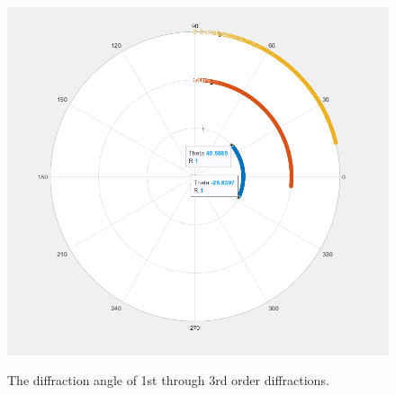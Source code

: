 \documentclass[journal]{IEEEtran}
\begin{document}
\begin{figure}[H]
    \centering
    \includegraphics[width=\linewidth]{images/DiffractionAngleCalculator.png}
    \label{fig:diffraction-angle}
    \caption{The diffraction angle of 1st through 3rd order diffractions.}
\end{figure}
\end{document}
